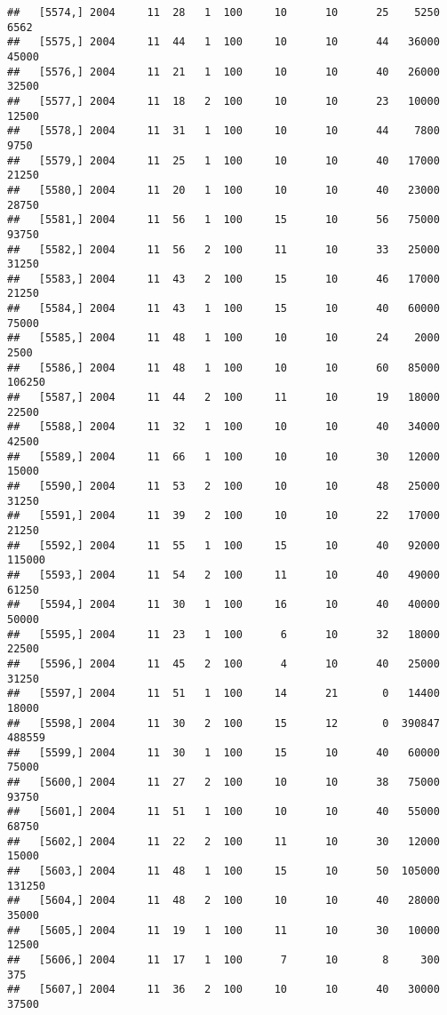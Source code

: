 \documentclass{article}\usepackage[]{graphicx}\usepackage[]{color}
\makeatletter
\newenvironment{kframe}{%
 \def\at@end@of@kframe{}%
 \ifinner\ifhmode%
  \def\at@end@of@kframe{\end{minipage}}%
  \begin{minipage}{\columnwidth}%
 \fi\fi%
 \def\FrameCommand##1{\hskip\@totalleftmargin \hskip-\fboxsep
 \colorbox{shadecolor}{##1}\hskip-\fboxsep
     \hskip-\linewidth \hskip-\@totalleftmargin \hskip\columnwidth}%
 \MakeFramed {\advance\hsize-\width
   \@totalleftmargin\z@ \linewidth\hsize
   \@setminipage}}%
 {\par\unskip\endMakeFramed%
 \at@end@of@kframe}
\newenvironment{knitrout}{}{} %
\makeatother
\begin{document}
\begin{knitrout}
\begin{kframe}
\begin{verbatim}
##   [5574,] 2004     11  28   1  100     10      10      25    5250    6562
##   [5575,] 2004     11  44   1  100     10      10      44   36000   45000
##   [5576,] 2004     11  21   1  100     10      10      40   26000   32500
##   [5577,] 2004     11  18   2  100     10      10      23   10000   12500
##   [5578,] 2004     11  31   1  100     10      10      44    7800    9750
##   [5579,] 2004     11  25   1  100     10      10      40   17000   21250
##   [5580,] 2004     11  20   1  100     10      10      40   23000   28750
##   [5581,] 2004     11  56   1  100     15      10      56   75000   93750
##   [5582,] 2004     11  56   2  100     11      10      33   25000   31250
##   [5583,] 2004     11  43   2  100     15      10      46   17000   21250
##   [5584,] 2004     11  43   1  100     15      10      40   60000   75000
##   [5585,] 2004     11  48   1  100     10      10      24    2000    2500
##   [5586,] 2004     11  48   1  100     10      10      60   85000  106250
##   [5587,] 2004     11  44   2  100     11      10      19   18000   22500
##   [5588,] 2004     11  32   1  100     10      10      40   34000   42500
##   [5589,] 2004     11  66   1  100     10      10      30   12000   15000
##   [5590,] 2004     11  53   2  100     10      10      48   25000   31250
##   [5591,] 2004     11  39   2  100     10      10      22   17000   21250
##   [5592,] 2004     11  55   1  100     15      10      40   92000  115000
##   [5593,] 2004     11  54   2  100     11      10      40   49000   61250
##   [5594,] 2004     11  30   1  100     16      10      40   40000   50000
##   [5595,] 2004     11  23   1  100      6      10      32   18000   22500
##   [5596,] 2004     11  45   2  100      4      10      40   25000   31250
##   [5597,] 2004     11  51   1  100     14      21       0   14400   18000
##   [5598,] 2004     11  30   2  100     15      12       0  390847  488559
##   [5599,] 2004     11  30   1  100     15      10      40   60000   75000
##   [5600,] 2004     11  27   2  100     10      10      38   75000   93750
##   [5601,] 2004     11  51   1  100     10      10      40   55000   68750
##   [5602,] 2004     11  22   2  100     11      10      30   12000   15000
##   [5603,] 2004     11  48   1  100     15      10      50  105000  131250
##   [5604,] 2004     11  48   2  100     10      10      40   28000   35000
##   [5605,] 2004     11  19   1  100     11      10      30   10000   12500
##   [5606,] 2004     11  17   1  100      7      10       8     300     375
##   [5607,] 2004     11  36   2  100     10      10      40   30000   37500

\end{verbatim}
\end{kframe}
\end{knitrout}
\end{document}
